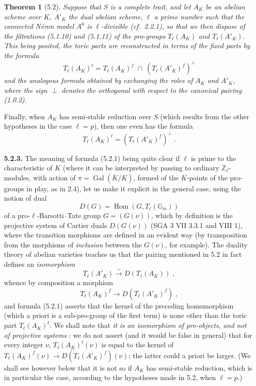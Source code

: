 \documentclass[11pt]{article}
\newtheorem{theoreme}[proposition]{Theorem}
\newcommand{\Hom}{\operatorname{Hom}}
\newcommand{\ZZ}{\mathbb Z}
\newcommand{\GG}{\mathbb G}
\newcommand{\Tl}{T_{\ell}}
\newcommand{\Gal}{\operatorname{Gal}}
\begin{document}
\begin{theoreme}[5.2]
Suppose that $S$ is a complete trait, and let $A_K$ be an abelian scheme
over $K$, $A'_K$ the dual abelian scheme, $\ell$ a prime number such that
the connected N\'eron model $A^0$ is $\ell$-divisible (cf.~2.2.1), so
that we then dispose of the filtrations (5.1.10) and (5.1.11) of the
pro-groups $\Tl(A_K)$ and $\Tl(A'_K)$. This being posited, the toric
parts are reconstructed in terms of the fixed parts by the formula
\begin{equation}
\Tl(A_K)^t = \Tl(A_K)^f \;\cap\; (\Tl(A'_K)^f)^{\perp}
\end{equation}
and the analogous formula obtained by exchanging the roles of $A_K$ and
$A'_K$, where the sign $\perp$ denotes the \emph{orthogonal} with respect
to the \emph{canonical pairing} (1.0.2).
\end{theoreme}

Finally, when $A_K$ has semi-stable reduction over $S$ (which results
from the other hypotheses in the case $\ell = p$), then one even has the
formula
\begin{equation}
\Tl(A_K)^t = (\Tl(A'_K)^f)^{\perp} \; .
\end{equation}

\noindent\textbf{5.2.3.} The meaning of formula (5.2.1) being quite
clear if $\ell$ is prime to the characteristic of $K$ (where it can be
interpreted by passing to ordinary $\ZZ_{\ell}$-modules, with action of
$\pi = \Gal(\overline{K}/K)$, formed of the $\overline{K}$-points of the
pro-groups in play, as in 2.4), let us make it explicit in the general
case, using the notion of dual
\begin{equation}
D(G) = \Hom(G, \Tl(\GG_m))
\end{equation}
of a pro-$\ell$-Barsotti--Tate group $G = (G(\nu))$, which by definition
is the projective system of Cartier duals $D(G(\nu))$ (SGA 3 VII
3.3.1 and VIII 1), where the transition morphisms are defined in an
evident way (by transposition from the morphisms of \emph{inclusion}
between the $G(\nu)$, for example). The duality theory of abelian
varieties teaches us that the pairing mentioned in 5.2 in fact defines
an \emph{isomorphism}
\begin{equation}
\Tl(A'_K) \overset{\sim}{\longrightarrow} D(\Tl(A_K)) \; ,
\end{equation}
whence by composition a morphism
\begin{equation}
\Tl(A_K)^f \longrightarrow D(\Tl(A'_K)^f) \; ,
\end{equation}
and formula (5.2.1) asserts that the kernel of the preceding homomorphism
(which a priori is a sub-pro-group of the first term) is none other than
the toric part $\Tl(A_K)^t$. We shall note that \emph{it is an
isomorphism of pro-objects, and not of projective systems} : we do not
assert (and it would be false in general) that for every integer $\nu$,
$\Tl(A_K)^t(\nu)$ is equal to the kernel of
$\Tl(A_K)^f(\nu) \to D(\Tl(A'_K)^f)(\nu)$; the latter could a priori be
larger. (We shall see however below that it is not so if $A_K$ has
semi-stable reduction, which is in particular the case, according to the
hypotheses made in 5.2, when $\ell = p$.)
\end{document}
